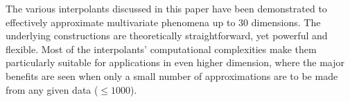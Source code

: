 \documentclass[smallextended,final]{svjour3}       %
\begin{document}
The various interpolants discussed in this paper have been demonstrated to effectively approximate multivariate phenomena up to $30$ dimensions. The underlying constructions are theoretically straightforward, yet powerful and flexible. Most of the interpolants' computational complexities make them particularly suitable for applications in even higher dimension, where the major benefits are seen when only a small number of approximations are to be made from any given data ($\leq 1000$).




\end{document}
